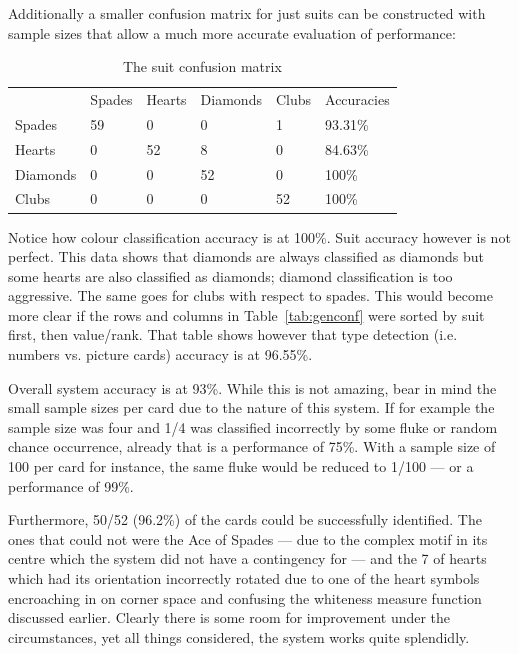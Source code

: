 \documentclass[a4paper,12pt,notitlepage]{article}
\begin{document}
	Additionally a smaller confusion matrix for just suits can be constructed with sample sizes that allow a much more accurate evaluation of performance:

	\begin{table}[H]
		\centering
		\caption{The suit confusion matrix}
		\label{tab:suitconf}
		\begin{tabular}{| l || l | l | l | l || l |}
			\hline
			         & Spades & Hearts & Diamonds & Clubs & Accuracies\\
			\hhline{|=|=|=|=|=|=|}
			Spades   & 59\cellcolor[gray]{0.9}  & 0  & 0  & 1\cellcolor[gray]{0.9}  & 93.31\% \\
			\hline
			Hearts   & 0  & 52\cellcolor[gray]{0.9}  & 8\cellcolor[gray]{0.9}  & 0  & 84.63\% \\
			\hline
			Diamonds & 0  & 0  & 52\cellcolor[gray]{0.9}  & 0  & 100\% \\
			\hline
			Clubs    & 0  & 0 & 0  & 52\cellcolor[gray]{0.9}  & 100\% \\
			\hline
		\end{tabular}
	\end{table}

	Notice how colour classification accuracy is at 100\%. Suit accuracy however is not perfect. This data shows that diamonds are always classified as diamonds but some hearts are also classified as diamonds; diamond classification is too aggressive. The same goes for clubs with respect to spades. This would become more clear if the rows and columns in Table~\ref{tab:genconf} were sorted by suit first, then value/rank. That table shows however that type detection (i.e. numbers vs. picture cards) accuracy is at 96.55\%.

	Overall system accuracy is at 93\%. While this is not amazing, bear in mind the small sample sizes per card due to the nature of this system. If for example the sample size was four and 1/4 was classified incorrectly by some fluke or random chance occurrence, already that is a performance of 75\%. With a sample size of 100 per card for instance, the same fluke would be reduced to 1/100 --- or a performance of 99\%.

	Furthermore, 50/52 (96.2\%) of the cards could be successfully identified. The ones that could not were the Ace of Spades --- due to the complex motif in its centre which the system did not have a contingency for --- and the 7 of hearts which had its orientation incorrectly rotated due to one of the heart symbols encroaching in on corner space and confusing the whiteness measure function discussed earlier. Clearly there is some room for improvement under the circumstances, yet all things considered, the system works quite splendidly.
\end{document}
